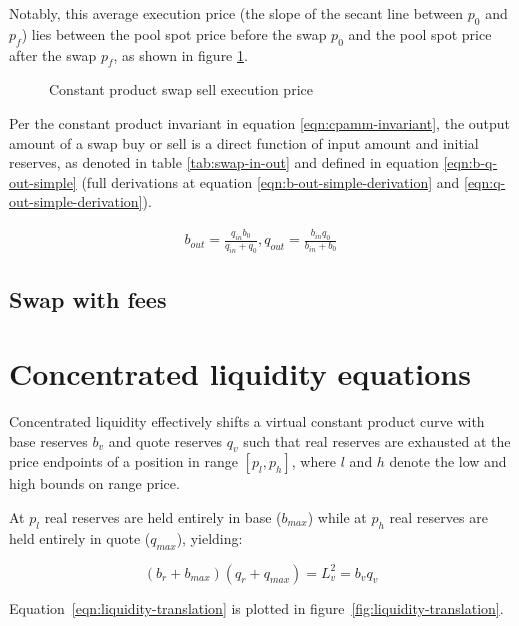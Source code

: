 \documentclass[table, twocolumn]{article}
\begin{document}
Notably, this average execution price (the slope of the secant line between $p_0$ and $p_f$) lies
between the pool spot price before the swap $p_0$ and the pool spot price after the swap $p_f$, as
shown in figure \ref{fig:cpmm-swap-sell-price}.

\begin{figure}[ht]
  \centering
  
  \caption{Constant product swap sell execution price}
  \label{fig:cpmm-swap-sell-price}
\end{figure}

Per the constant product invariant in equation \ref{eqn:cpamm-invariant}, the output amount of a
swap buy or sell is a direct function of input amount and initial reserves, as denoted in table
\ref{tab:swap-in-out} and defined in equation \ref{eqn:b-q-out-simple} (full derivations at equation
\ref{eqn:b-out-simple-derivation} and \ref{eqn:q-out-simple-derivation}).

\begin{align} \label{eqn:b-q-out-simple}
  b_{out} = \frac{q_{in} b_0}{q_{in} + q_0}, q_{out} = \frac{b_{in} q_0}{b_{in} + b_0}
\end{align}

\subsection{Swap with fees}

\section{Concentrated liquidity equations}

Concentrated liquidity effectively shifts a virtual constant product curve with base reserves $b_v$
and quote reserves $q_v$ such that real reserves are exhausted at the price endpoints of a position
in range $[p_l, p_h]$, where $l$ and $h$ denote the low and high bounds on range price.

At $p_l$ real reserves are held entirely in base ($b_{max}$) while at $p_h$ real reserves are held
entirely in quote ($q_{max}$), yielding:

\begin{equation} \label{eqn:liquidity-translation}
  (b_r + b_{max})(q_r + q_{max}) = L_v^2 = b_v q_v
\end{equation}

Equation~\ref{eqn:liquidity-translation} is plotted in figure~\ref{fig:liquidity-translation}.
\end{document}
